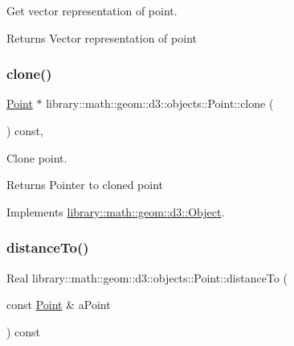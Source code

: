 Get vector representation of point. 

\begin{DoxyReturn}{Returns}
Vector representation of point 
\end{DoxyReturn}
\mbox{\label{classlibrary_1_1math_1_1geom_1_1d3_1_1objects_1_1_point_a32aa1e233c6ac5341605961f6bf0f210}} 
\subsubsection{\texorpdfstring{clone()}{clone()}}
{\footnotesize\ttfamily \hyperlink{classlibrary_1_1math_1_1geom_1_1d3_1_1objects_1_1_point}{Point} $\ast$ library\+::math\+::geom\+::d3\+::objects\+::\+Point\+::clone (\begin{DoxyParamCaption}{ }\end{DoxyParamCaption}) const\hspace{0.3cm}{\ttfamily [override]}, {\ttfamily [virtual]}}



Clone point. 

\begin{DoxyReturn}{Returns}
Pointer to cloned point 
\end{DoxyReturn}


Implements \hyperlink{classlibrary_1_1math_1_1geom_1_1d3_1_1_object_a1a784c6b359e0eb97cd34fabc42f2f3f}{library\+::math\+::geom\+::d3\+::\+Object}.

\mbox{\label{classlibrary_1_1math_1_1geom_1_1d3_1_1objects_1_1_point_a0108b685599f2684837d2898250c5a36}} 
\subsubsection{\texorpdfstring{distance\+To()}{distanceTo()}}
{\footnotesize\ttfamily Real library\+::math\+::geom\+::d3\+::objects\+::\+Point\+::distance\+To (\begin{DoxyParamCaption}\item[{const \hyperlink{classlibrary_1_1math_1_1geom_1_1d3_1_1objects_1_1_point}{Point} \&}]{a\+Point }\end{DoxyParamCaption}) const}



